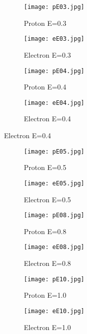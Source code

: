 \documentclass[14paper,11pt,hidelinks]{article}
\begin{document}
\begin{figure}[h!]
\centering
\begin{subfigure}[b]{0.3\linewidth}
\texttt{[image: pE03.jpg]} 
\caption*{Proton E=0.3}
\end{subfigure}
\begin{subfigure}[b]{0.3\linewidth}
\texttt{[image: eE03.jpg]}
\caption*{Electron E=0.3}
\end{subfigure}
\caption{}
\end{figure}
\begin{figure}[h!]
\centering
\begin{subfigure}[b]{0.3\linewidth}
\texttt{[image: pE04.jpg]} 
\caption*{Proton E=0.4}
\end{subfigure}
\begin{subfigure}[b]{0.3\linewidth}
\texttt{[image: eE04.jpg]}
\caption*{Electron E=0.4}
\end{subfigure}
\end{figure}
\begin{figure}[h!]
\centering
\begin{subfigure}[b]{0.3\linewidth}
\texttt{[image: pE05.jpg]} 
\caption*{Proton E=0.5}
\end{subfigure}
\begin{subfigure}[b]{0.3\linewidth}
\texttt{[image: eE05.jpg]}
\caption*{Electron E=0.5}
\end{subfigure}
\caption{}
\end{figure}
\begin{figure}[h!]
\centering
\begin{subfigure}[b]{0.3\linewidth}
\texttt{[image: pE08.jpg]} 
\caption*{Proton E=0.8}
\end{subfigure}
\begin{subfigure}[b]{0.3\linewidth}
\texttt{[image: eE08.jpg]}
\caption*{Electron E=0.8}
\end{subfigure}
\caption{}
\end{figure}
\begin{figure}[h!]
\centering
\begin{subfigure}[b]{0.3\linewidth}
\texttt{[image: pE10.jpg]} 
\caption*{Proton E=1.0}
\end{subfigure}
\begin{subfigure}[b]{0.3\linewidth}
\texttt{[image: eE10.jpg]}
\caption*{Electron E=1.0}
\end{subfigure}
\caption{}
\end{figure}
\end{document}
